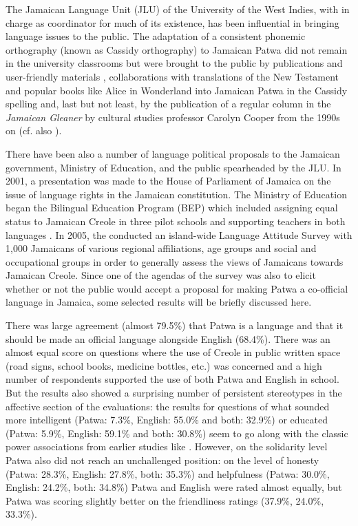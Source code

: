 \documentclass[output=paper,colorlinks,citecolor=brown]{langscibook}
\begin{document}
The Jamaican Language Unit (JLU) of the University of the West Indies, with \citeauthor{devonish1986_liberation} in charge as coordinator for much of its existence, has been influential in bringing language issues to the public. The adaptation of a consistent phonemic orthography (known as Cassidy orthography) to Jamaican Patwa did not remain in the university classrooms but were brought to the public by publications and user-friendly materials \citep{JLU2009,JLU2009_video}, collaborations with translations of the New Testament \citeyearpar{biblesociety2012} and popular books like Alice in Wonderland \citeyearpar{Alis_advencha2016} into Jamaican Patwa in the Cassidy spelling and, last but not least, by the publication of a regular column in the \textit{Jamaican Gleaner} by cultural studies professor Carolyn Cooper from the 1990s on (cf. also \citealt{mühleisen1999konkur}).

There have been also a number of language political proposals to the Jamaican government, Ministry of Education, and the public spearheaded by the JLU. In 2001, a presentation was made to the House of Parliament of Jamaica on the issue of language rights in the Jamaican constitution. The Ministry of Education began the Bilingual Education Program (BEP) which included assigning equal status to Jamaican Creole in three pilot schools and supporting teachers in both languages \citep{morren_morren2007}. In 2005, the \citeauthor{JLU2005_survey} conducted an island-wide Language Attitude Survey with 1,000 Jamaicans of various regional affiliations, age groups and social and occupational groups in order to generally assess the views of Jamaicans towards Jamaican Creole. Since one of the agendas of the survey was also to elicit whether or not the public would accept a proposal for making Patwa a co-official language in Jamaica, some selected results will be briefly discussed here.

There was large agreement (almost 79.5\%) that Patwa is a language and that it should be made an official language alongside English (68.4\%). There was an almost equal score on questions where the use of Creole in public written space (road signs, school books, medicine bottles, etc.) was concerned and a high number of respondents supported the use of both Patwa and English in school. But the results also showed a surprising number of persistent stereotypes in the affective section of the evaluations: the results for questions of what sounded more intelligent (Patwa: 7.3\%, English: 55.0\% and both: 32.9\%) or educated (Patwa: 5.9\%, English: 59.1\% and both: 30.8\%) seem to go along with the classic power associations from earlier studies like  \citet{rickford1983standard}. However, on the solidarity level Patwa also did not reach an unchallenged position: on the level of honesty (Patwa: 28.3\%, English: 27.8\%, both: 35.3\%) and helpfulness (Patwa: 30.0\%, English: 24.2\%, both: 34.8\%) Patwa and English were rated almost equally, but Patwa was scoring slightly better on the friendliness ratings (37.9\%, 24.0\%, 33.3\%).
\end{document}
